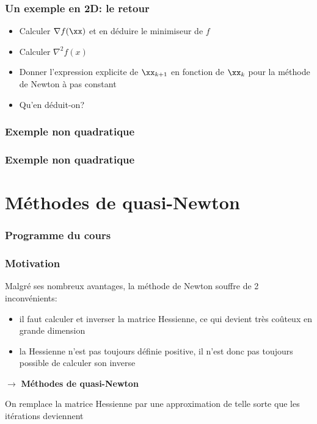 \documentclass[9pt,table]{beamer} %
\begin{document}
\begin{frame}
\frametitle{Un exemple en 2D: le retour}


\begin{itemize}[label=-]
	\item Calculer $\nabla f(\xx)$ et en déduire le minimiseur de $f$
	\item Calculer $\nabla^2 f(x)$
	\item Donner l'expression explicite de $\xx_{k+1}$ en fonction de $\xx_k$ pour la méthode de Newton à pas constant
	\item Qu'en déduit-on?
\end{itemize}
\end{frame}

\begin{frame}
\frametitle{Exemple non quadratique}


\end{frame}

\begin{frame}
\frametitle{Exemple non quadratique}


\end{frame}



\section{Méthodes de quasi-Newton}
\begin{frame}
\frametitle{Programme du cours}
\tableofcontents[currentsection]
\end{frame}


\begin{frame}
\frametitle{Motivation}

Malgré ses nombreux avantages, la méthode de Newton souffre de 2 inconvénients:
\begin{itemize}[label=-]
	\item il faut calculer et inverser la matrice Hessienne, ce qui devient très coûteux en grande dimension
	\item la Hessienne n'est pas toujours définie positive, il n'est donc pas toujours possible de calculer son inverse
\end{itemize}

\bigbreak

$\rightarrow$ \textbf{\alert{Méthodes de quasi-Newton}}
\begin{tcolorbox}
	On remplace la matrice Hessienne par une approximation
	de telle sorte que les itérations deviennent
\end{tcolorbox}
\end{frame}
\end{document}
